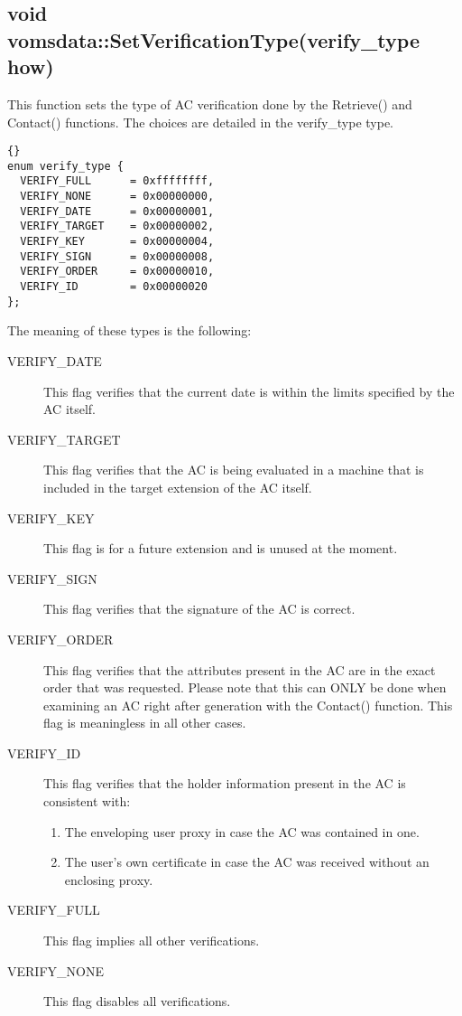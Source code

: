 \documentclass[a4paper]{book}
\begin{document}
\subsection{void vomsdata::SetVerificationType(verify\_type how)}

This function sets the type of AC verification done by the Retrieve() and
Contact() functions.  The choices are detailed in the verify\_type
type.

\begin{lstlisting}{}
enum verify_type {
  VERIFY_FULL      = 0xffffffff,
  VERIFY_NONE      = 0x00000000,
  VERIFY_DATE      = 0x00000001,
  VERIFY_TARGET    = 0x00000002,
  VERIFY_KEY       = 0x00000004,
  VERIFY_SIGN      = 0x00000008,
  VERIFY_ORDER     = 0x00000010,
  VERIFY_ID        = 0x00000020
};
\end{lstlisting}

The meaning of these types is the following:
\begin{description}
\item[VERIFY\_DATE] This flag verifies that the current date is
  within the limits specified by the AC itself.
\item[VERIFY\_TARGET] This flag verifies that the AC is being
  evaluated in a machine that is included in the target extension of
  the AC itself.
\item[VERIFY\_KEY] This flag is for a future extension and is unused at the
  moment. 
\item[VERIFY\_SIGN] This flag verifies that the signature of the AC
  is correct.
\item[VERIFY\_ORDER] This flag verifies that the attributes present
  in the AC are in the exact order that was requested.  Please note
  that this can ONLY be done when examining an AC right after
  generation with the Contact() function.  This flag is meaningless
  in all other cases.
\item[VERIFY\_ID] This flag verifies that the holder information
  present in the AC is consistent with:
\begin{enumerate}
\item The enveloping user proxy in case the AC was contained in one.
\item The user's own certificate in case the AC was received without
  an enclosing proxy.
\end{enumerate}
\item[VERIFY\_FULL] This flag implies all other verifications.
\item[VERIFY\_NONE] This flag disables all verifications.
\end{description}
\end{document}
